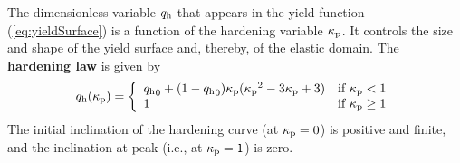 \documentclass[a4paper]{article}
\begin{document}
The dimensionless variable $q_{\rm h}$ that appears in the yield function (\ref{eq:yieldSurface}) is a function of the hardening variable $\kappa_{\rm p}$. It controls the size and shape of the yield surface and, thereby, of the elastic domain. 
The {\bf hardening law} is given by
%
\begin{equation} \label{eq:hardeningLaw}
q_{\rm h}(\kappa_{\rm p}) = \left\{ \begin{array}{ll}
{q_{\rm h}}_0 + (1-{q_{\rm h}}_0)\kappa_{\rm p}({\kappa_{\rm p}}^2 - 3\kappa_{\rm p}+3) & \mbox{if $\kappa_{\rm p} < 1$} \\
1 & \mbox{if $\kappa_{\rm p} \ge 1$}
\end{array}
\right.
\end{equation}
%
The initial inclination of the hardening curve (at $\kappa_{\rm p}=0$) is positive and finite, and the inclination at peak (i.e., at $\kappa_{\rm p} = 1$) is zero.
\end{document}
